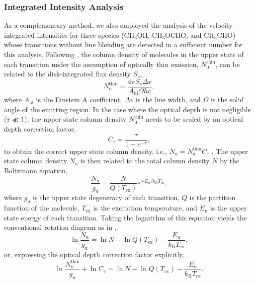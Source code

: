 \documentclass[linenumbers, twocolumn, twocolappendix, astrosymb, times]{aastex631}
\newcommand{\methanol}{CH$_3$OH\xspace}
\newcommand{\acetaldehyde}{CH$_3$CHO\xspace}
\newcommand{\methylformate}{CH$_3$OCHO\xspace}
\begin{document}
\subsubsection{Integrated Intensity Analysis}
As a complementary method, we also employed the analysis of the velocity-integrated intensities \citep[e.g.,][]{Goldsmith1999} for three species (\methanol, \methylformate, and \acetaldehyde) whose transitions without line blending are detected in a sufficient number for this analysis. Following \citet{Goldsmith1999}, the column density of molecules in the upper state of each transition under the assumption of optically thin emission, $N_\mathrm{u}^{\mathrm{thin}}$, can be related to the disk-integrated flux density $S_\nu$,
\begin{equation}
    N_\mathrm{u}^\mathrm{thin} = \frac{4\pi S_\nu \Delta v}{A_\mathrm{ul}\Omega hc},
\end{equation}
where $A_\mathrm{ul}$ is the Einstein A coefficient, $\Delta v$ is the line width, and $\Omega$ is the solid angle of the emitting region. In the case where the optical depth is not negligible ($\tau \nll 1$), the upper state column density $N_\mathrm{u}^\mathrm{thin}$ needs to be scaled by an optical depth correction factor,
\begin{equation}\label{eq:tau_correction_factor}
    C_\tau = \frac{\tau}{1 - e^{-\tau}},
\end{equation}
to obtain the correct upper state column density, i.e., $N_\mathrm{u} = N_\mathrm{u}^\mathrm{thin} C_\tau$ \citep{Goldsmith1999}. The upper state column density $N_\mathrm{u}$ is then related to the total column density $N$ by the Boltzmann equation,
\begin{equation}
    \frac{N_\mathrm{u}}{g_\mathrm{u}} = \frac{N}{Q(T_\mathrm{ex})}e^{-E_\mathrm{u} / k_\mathrm{B} T_\mathrm{ex}},
\end{equation}
where $g_\mathrm{u}$ is the upper state degeneracy of each transition, $Q$ is the partition function of the molecule, $T_\mathrm{ex}$ is the excitation temperature, and $E_\mathrm{u}$ is the upper state energy of each transition. Taking the logarithm of this equation yields the conventional rotation diagram as in \citet{Goldsmith1999},
\begin{equation}
    \ln\frac{N_\mathrm{u}}{g_\mathrm{u}} = \ln N - \ln Q(T_\mathrm{ex}) - \frac{E_\mathrm{u}}{k_\mathrm{B}T_\mathrm{ex}},
\end{equation}
or, expressing the optical depth correction factor explicitly,
\begin{equation}\label{eq:rotation_diagram}
    \ln\frac{N_\mathrm{u}^\mathrm{thin}}{g_\mathrm{u}} + \ln C_\tau = \ln N - \ln Q(T_\mathrm{ex}) - \frac{E_\mathrm{u}}{k_\mathrm{B}T_\mathrm{ex}}.
\end{equation}
\end{document}
